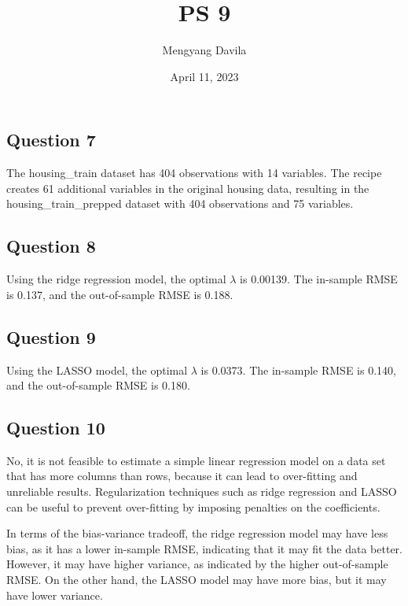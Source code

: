 \documentclass{article}
\title{PS 9}
\author{Mengyang Davila}
\date{April 11, 2023}
\begin{document}
\maketitle

\subsection*{Question 7}
The housing\_train dataset has 404 observations with 14 variables. The recipe creates 61 additional variables in the original housing data, resulting in the housing\_train\_prepped dataset with 404 observations and 75 variables. 

\subsection*{Question 8}
Using the ridge regression model, the optimal $\lambda$ is 0.00139. The in-sample RMSE is 0.137, and the out-of-sample RMSE is 0.188.

\subsection*{Question 9}
Using the LASSO model, the optimal $\lambda$ is 0.0373. The in-sample RMSE is 0.140, and the out-of-sample RMSE is 0.180.

\subsection*{Question 10}
No, it is not feasible to estimate a simple linear regression model on a data set that has more columns than rows, because it can lead to over-fitting and unreliable results. Regularization techniques such as ridge regression and LASSO can be useful to prevent over-fitting by imposing penalties on the coefficients.

In terms of the bias-variance tradeoff, the ridge regression model may have less bias, as it has a lower in-sample RMSE, indicating that it may fit the data better. However, it may have higher variance, as indicated by the higher out-of-sample RMSE. On the other hand, the LASSO model may have more bias, but it may have lower variance.
\end{document}
